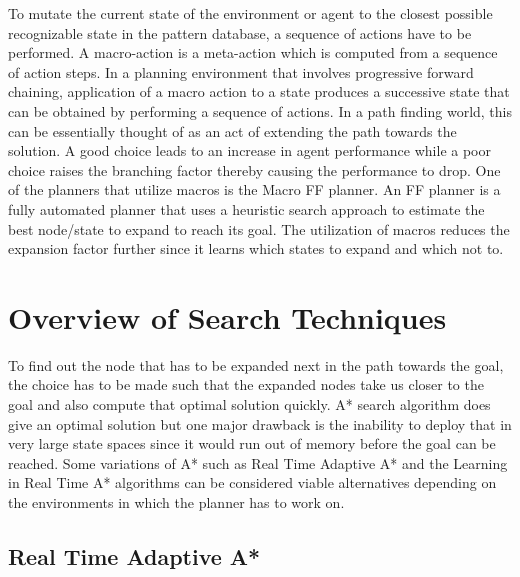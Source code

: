 \documentclass[tog]{acmsiggraph}
\begin{document}
To mutate the current state of the environment or agent to the closest
possible recognizable state in the pattern database, a sequence of
actions have to be performed. A macro-action is a meta-action which is
computed from a sequence of action steps. In a planning environment
that involves progressive forward chaining, application of a macro
action to a state produces a successive state that can be obtained by
performing a sequence of actions. In a path finding world, this can be
essentially thought of as an act of extending the path towards the
solution. A good choice leads to an increase in agent performance
while a poor choice raises the branching factor thereby causing the
performance to drop. One of the planners that utilize macros is the
Macro FF planner. An FF planner is a fully automated planner that uses
a heuristic search approach to estimate the best node/state to expand
to reach its goal. The utilization of macros reduces the expansion
factor further since it learns which states to expand and which not
to.

\section{Overview of Search Techniques}


To find out the node that has to be expanded next in the path towards
the goal, the choice has to be made such that the expanded nodes take
us closer to the goal and also compute that optimal solution quickly.
A* search algorithm does give an optimal solution but one major
drawback is the inability to deploy that in very large state spaces
since it would run out of memory before the goal can be reached. Some
variations of A* such as Real Time Adaptive A* and the Learning in
Real Time A* algorithms can be considered viable alternatives
depending on the environments in which the planner has to work on.

\subsection{Real Time Adaptive A*}
\end{document}
